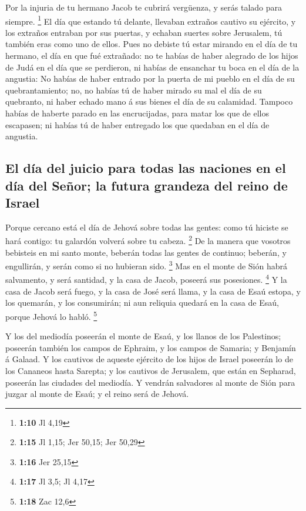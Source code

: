  Por la injuria de tu hermano Jacob te cubrirá vergüenza,
y serás talado para siempre. \footnote{\textbf{1:10} Jl 4,19}
 El día que estando tú delante, llevaban extraños cautivo
su ejército, y los extraños entraban por sus puertas, y echaban suertes
sobre Jerusalem, tú también eras como uno de ellos.  Pues
no debiste tú estar mirando en el día de tu hermano, el día en que fué
extrañado: no te habías de haber alegrado de los hijos de Judá en el día
que se perdieron, ni habías de ensanchar tu boca en el día de la
angustia:  No habías de haber entrado por la puerta de mi
pueblo en el día de su quebrantamiento; no, no habías tú de haber mirado
su mal el día de su quebranto, ni haber echado mano á sus bienes el día
de su calamidad.  Tampoco habías de haberte parado en las
encrucijadas, para matar los que de ellos escapasen; ni habías tú de
haber entregado los que quedaban en el día de angustia.

\hypertarget{el-duxeda-del-juicio-para-todas-las-naciones-en-el-duxeda-del-seuxf1or-la-futura-grandeza-del-reino-de-israel}{%
\subsection{El día del juicio para todas las naciones en el día del
Señor; la futura grandeza del reino de
Israel}\label{el-duxeda-del-juicio-para-todas-las-naciones-en-el-duxeda-del-seuxf1or-la-futura-grandeza-del-reino-de-israel}}

 Porque cercano está el día de Jehová sobre todas las
gentes: como tú hiciste se hará contigo: tu galardón volverá sobre tu
cabeza. \footnote{\textbf{1:15} Jl 1,15; Jer 50,15; Jer 50,29}
 De la manera que vosotros bebisteis en mi santo monte,
beberán todas las gentes de continuo; beberán, y engullirán, y serán
como si no hubieran sido. \footnote{\textbf{1:16} Jer 25,15}
 Mas en el monte de Sión habrá salvamento, y será
santidad, y la casa de Jacob, poseerá sus posesiones. \footnote{\textbf{1:17}
  Jl 3,5; Jl 4,17}  Y la casa de Jacob será fuego, y la
casa de José será llama, y la casa de Esaú estopa, y los quemarán, y los
consumirán; ni aun reliquia quedará en la casa de Esaú, porque Jehová lo
habló. \footnote{\textbf{1:18} Zac 12,6}

 Y los del mediodía poseerán el monte de Esaú, y los
llanos de los Palestinos; poseerán también los campos de Ephraim, y los
campos de Samaria; y Benjamín á Galaad.  Y los cautivos
de aqueste ejército de los hijos de Israel poseerán lo de los Cananeos
hasta Sarepta; y los cautivos de Jerusalem, que están en Sepharad,
poseerán las ciudades del mediodía.  Y vendrán salvadores
al monte de Sión para juzgar al monte de Esaú; y el reino será de
Jehová.
